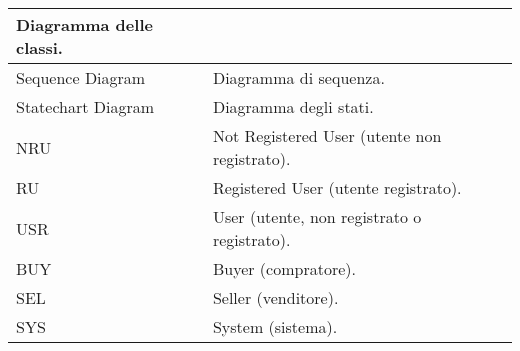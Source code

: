 \begin{tabular}{|C{3.5cm}|L{11.2cm}|}
                Diagramma delle classi. \\
            \hline
                Sequence Diagram &
                Diagramma di sequenza. \\
            \hline
                Statechart Diagram &
                Diagramma degli stati. \\
            \hline
                NRU &
                Not Registered User (utente non registrato). \\
            \hline
                RU &
                Registered User (utente registrato). \\
            \hline
                USR &
                User (utente, non registrato o registrato). \\
            \hline
                BUY &
                Buyer (compratore). \\
            \hline
                SEL &
                Seller (venditore). \\
            \hline
                SYS &
                System (sistema). \\
            \hline
        \end{tabular}